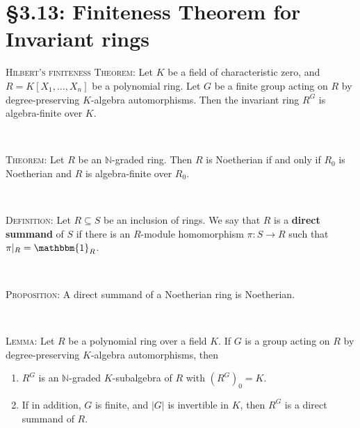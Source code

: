 \documentclass[12pt]{amsart}
\newcommand{\N}{\mathbb{N}}
\newcommand{\1}{\mathbbm{1}}
\newcommand{\showsol}[1]{\def\displaysol{#1}}
\begin{document}
\showsol{0}
	
	\thispagestyle{empty}
	
	\section*{\S3.13: Finiteness Theorem for Invariant rings}	

\begin{framed}

\noindent \textsc{Hilbert's finiteness Theorem:} Let $K$ be a field of characteristic zero, and $R=K[X_1,\dots,X_n]$ be a polynomial ring. Let $G$ be a finite group acting on $R$ by degree-preserving $K$-algebra automorphisms. Then the invariant ring $R^G$ is algebra-finite over $K$.

\

\noindent \textsc{Theorem:} Let $R$ be an $\N$-graded ring. Then $R$ is Noetherian if and only if $R_0$ is Noetherian and $R$ is algebra-finite over $R_0$.

\


\noindent \textsc{Definition:} Let $R\subseteq S$ be an inclusion of rings. We say that $R$ is a \textbf{direct summand} of $S$ if there is an $R$-module homomorphism $\pi:S\to R$ such that $\pi|_R=\1_R$.

\

\noindent \textsc{Proposition:} A direct summand of a Noetherian ring is Noetherian. 

\

\noindent \textsc{Lemma:} Let $R$ be a polynomial ring over a field $K$. If $G$ is a group acting on $R$ by degree-preserving $K$-algebra automorphisms, then
\begin{enumerate}
\item $R^G$ is an $\N$-graded $K$-subalgebra of $R$ with $(R^G)_0=K$.
\item If in addition, $G$ is finite, and $|G|$ is invertible in $K$, then $R^G$ is a direct summand of $R$.
\end{enumerate}
 \end{framed}
 
\end{document}
